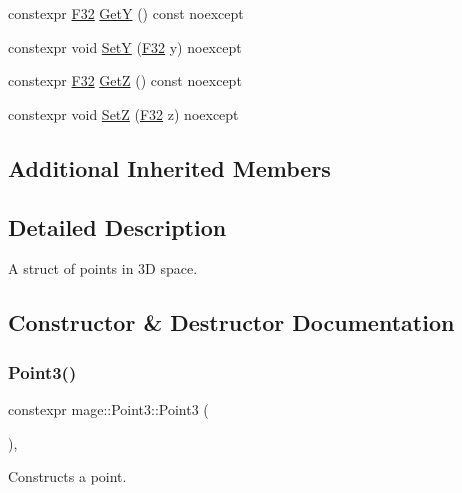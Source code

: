 \begin{DoxyCompactItemize}
\item 
constexpr \mbox{\hyperlink{namespacemage_aa97e833b45f06d60a0a9c4fc22ae02c0}{F32}} \mbox{\hyperlink{structmage_1_1_point3_a63a6f60b65b3c3b8fadc03f229f410a1}{GetY}} () const noexcept
\item 
constexpr void \mbox{\hyperlink{structmage_1_1_point3_a7ac2ea5fcd095cf86efa1597c0da270d}{SetY}} (\mbox{\hyperlink{namespacemage_aa97e833b45f06d60a0a9c4fc22ae02c0}{F32}} y) noexcept
\item 
constexpr \mbox{\hyperlink{namespacemage_aa97e833b45f06d60a0a9c4fc22ae02c0}{F32}} \mbox{\hyperlink{structmage_1_1_point3_a9dd6e12e7c66eb8b3ab8de6cfa13d612}{GetZ}} () const noexcept
\item 
constexpr void \mbox{\hyperlink{structmage_1_1_point3_a37225058268534202f89421467138668}{SetZ}} (\mbox{\hyperlink{namespacemage_aa97e833b45f06d60a0a9c4fc22ae02c0}{F32}} z) noexcept
\end{DoxyCompactItemize}
\subsection*{Additional Inherited Members}


\subsection{Detailed Description}
A struct of points in 3D space. 

\subsection{Constructor \& Destructor Documentation}
\mbox{\label{structmage_1_1_point3_a5615d9dddc6cedf47df9047fd23b7833}} 
\subsubsection{\texorpdfstring{Point3()}{Point3()}\hspace{0.1cm}{\footnotesize\ttfamily [1/5]}}
{\footnotesize\ttfamily constexpr mage\+::\+Point3\+::\+Point3 (\begin{DoxyParamCaption}{ }\end{DoxyParamCaption})\hspace{0.3cm}{\ttfamily [default]}, {\ttfamily [noexcept]}}

Constructs a point. \mbox{\label{structmage_1_1_point3_ade2447542de93cfeeb7209cdfa3051e7}} 

